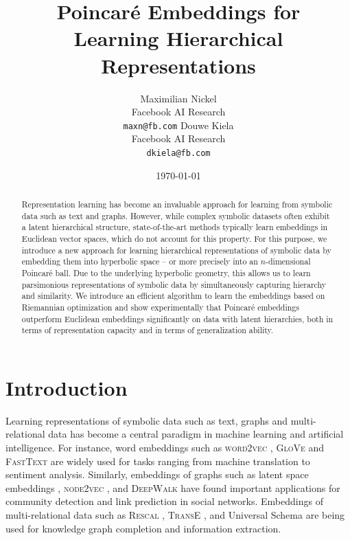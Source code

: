 \documentclass[11pt]{article}
\author{Maximilian Nickel\\
Facebook AI Research\\
\texttt{maxn@fb.com}
\And
Douwe Kiela\\
Facebook AI Research\\
\texttt{dkiela@fb.com}}
\date{\today}
\title{Poincaré Embeddings for \\  Learning Hierarchical Representations}
\newcommand{\method}[1]{\textsc{#1}\xspace}
\begin{document}
\maketitle
\begin{abstract}
Representation learning has become an invaluable approach for learning from
symbolic data such as text and graphs. However, while complex symbolic datasets
often exhibit a latent hierarchical structure, state-of-the-art methods typically
learn embeddings in Euclidean vector spaces, which do not account for this property. 
For this purpose, we introduce a new approach for
learning hierarchical representations of symbolic data by embedding them into
hyperbolic space -- or more precisely into an \(n\)-dimensional Poincaré ball.
Due to the underlying hyperbolic geometry, this allows us to learn parsimonious
representations of symbolic data by simultaneously capturing hierarchy and
similarity. We introduce an efficient algorithm to learn the embeddings based on
Riemannian optimization and show experimentally that Poincaré embeddings
outperform Euclidean embeddings significantly on data with latent hierarchies,
both in terms of representation capacity and in terms of generalization ability.
\end{abstract}

\section{Introduction}
\label{sec:intro}
Learning representations of symbolic data such as text, graphs and
multi-relational data has become a central paradigm in machine learning and
artificial intelligence. For instance, word embeddings such as \method{word2vec}
\cite{DBLP:journals/corr/MikolovSCCD13}, \method{GloVe} \cite{pennington2014glove}
and \method{FastText} \cite{bojanowski2016enriching} are widely used for tasks
ranging from machine translation to sentiment analysis. Similarly, embeddings of
graphs such as latent space embeddings \cite{hoff2002latent}, \method{node2vec}
\cite{grover2016node2vec}, and \method{DeepWalk} \cite{perozzi2014deepwalk} have
found important applications for community detection and link prediction in
social networks. Embeddings of multi-relational data such as \method{Rescal}
\cite{DBLP:conf/icml/NickelTK11}, \method{TransE}
\cite{DBLP:conf/nips/BordesUGWY13}, and Universal Schema \cite{riedel2013relation}
are being used for knowledge graph completion and information extraction.
\end{document}
